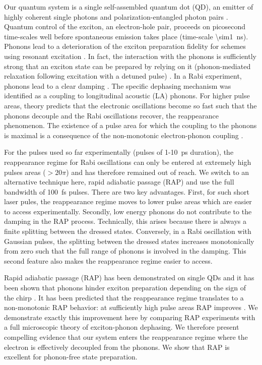 \documentclass[aps,prl,reprint,superscriptaddress]{revtex4-1}
\begin{document}
Our quantum system is a single self-assembled quantum dot (QD), an emitter of highly coherent single photons and polarization-entangled photon pairs \cite{Kaldewey2017biexc}. Quantum control of the exciton, an electron-hole pair, proceeds on picosecond time-scales well before spontaneous emission takes place (time-scale \SI{\sim1}{\nano\second}). Phonons lead to a deterioration of the exciton preparation fidelity for schemes using resonant excitation \cite{Ramsay2010_oct,Ramsay2010,Ramsay2010review,krugel2005the,vagov2007non,Reiter2014}. In fact, the interaction with the phonons is sufficiently strong that an exciton state can be prepared by relying on it (phonon-mediated relaxation following excitation with a detuned pulse) \cite{Reiter2012,Glassl2013Phonon,Quilter2015pho,Bounouar2015,Ardelt2014}. In a Rabi experiment, phonons lead to a clear damping \cite{Ramsay2010_oct,Ramsay2010}. The specific dephasing mechanism was identified as a coupling to longitudinal acoustic (LA) phonons. For higher pulse areas, theory predicts that the electronic oscillations become so fast such that the phonons decouple and the Rabi oscillations recover, the reappearance phenomenon. The existence of a pulse area for which the coupling to the phonons is maximal is a consequence of the non-monotonic electron-phonon coupling \cite{vagov2007non,wigger2014ene}.

For the pulses used so far experimentally (pulses of 1-10~ps duration), the reappearance regime for Rabi oscillations can only be entered at extremely high pulses areas ($>20 \pi$) and has therefore remained out of reach. We switch to an alternative technique here, rapid adiabatic passage (RAP) \cite{Simon2011,Wu2011,Luker2012,Gawarecki2012,debnath2012chi,Glassl2013,Mathew2014,Wei2014} and use the full bandwidth of \SI{100}{\femto\second} pulses. There are two key advantages. First, for such short laser pules, the reappearance regime moves to lower pulse areas which are easier to access experimentally. Secondly, low energy phonons do not contribute to the damping in the RAP process. Technically, this arises because there is always a finite splitting between the dressed states. Conversely, in a Rabi oscillation with Gaussian pulses, the splitting between the dressed states increases monotonically from zero such that the full range of phonons is involved in the damping. This second feature also makes the reappearance regime easier to access.

Rapid adiabatic passage (RAP) has been demonstrated on single QDs \cite{Simon2011,Wu2011,Wei2014} and it has been shown that phonons hinder exciton preparation depending on the sign of the chirp \cite{Luker2012,Mathew2014}. It has been predicted that the reappearance regime translates to a non-monotonic RAP behavior: at sufficiently high pulse areas RAP improves \cite{Reiter2012}. We demonstrate exactly this improvement here by comparing RAP experiments with a full microscopic theory of exciton-phonon dephasing. We therefore present compelling evidence that our system enters the reappearance regime where the electron is effectively decoupled from the phonons. We show that RAP is excellent for phonon-free state preparation.
\end{document}
